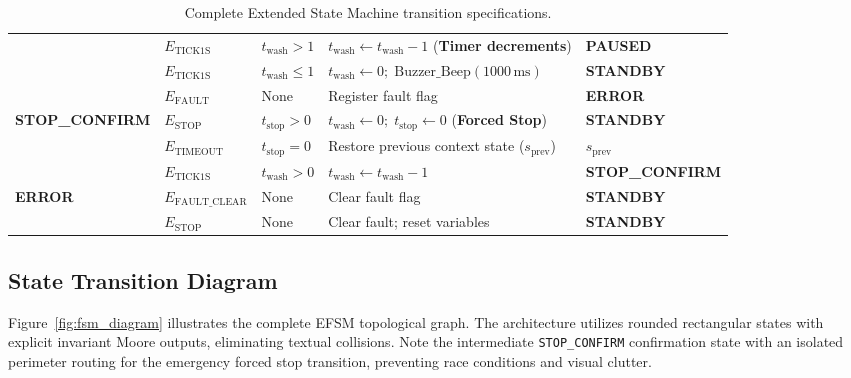\documentclass[12pt]{article}
\begin{document}
\begin{table}[H]
\begin{tabularx}{\textwidth}{l l l X l}
  & $E_{\text{TICK1S}}$ & $t_{\text{wash}} > 1$ & $t_{\text{wash}} \leftarrow t_{\text{wash}} - 1$ (\textbf{Timer decrements}) & \textbf{PAUSED} \\
  & $E_{\text{TICK1S}}$ & $t_{\text{wash}} \le 1$ & $t_{\text{wash}} \leftarrow 0;\; \text{Buzzer\_Beep}(1000\,\text{ms})$ & \textbf{STANDBY} \\
  & $E_{\text{FAULT}}$ & None & Register fault flag & \textbf{ERROR} \\
\midrule
\multirow{3}{*}{\textbf{STOP\_CONFIRM}} 
  & $E_{\text{STOP}}$ & $t_{\text{stop}} > 0$ & $t_{\text{wash}} \leftarrow 0;\; t_{\text{stop}} \leftarrow 0$ (\textbf{Forced Stop}) & \textbf{STANDBY} \\
  & $E_{\text{TIMEOUT}}$ & $t_{\text{stop}} = 0$ & Restore previous context state ($s_{\text{prev}}$) & $s_{\text{prev}}$ \\
  & $E_{\text{TICK1S}}$ & $t_{\text{wash}} > 0$ & $t_{\text{wash}} \leftarrow t_{\text{wash}} - 1$ & \textbf{STOP\_CONFIRM} \\
\midrule
\multirow{2}{*}{\textbf{ERROR}} 
  & $E_{\text{FAULT\_CLEAR}}$ & None & Clear fault flag & \textbf{STANDBY} \\
  & $E_{\text{STOP}}$ & None & Clear fault; reset variables & \textbf{STANDBY} \\
\bottomrule
\end{tabularx}
\caption{Complete Extended State Machine transition specifications.}
\label{tab:transition_table}
\end{table}

\subsection{State Transition Diagram}
Figure~\ref{fig:fsm_diagram} illustrates the complete EFSM topological graph. The architecture utilizes rounded rectangular states with explicit invariant Moore outputs, eliminating textual collisions. Note the intermediate \texttt{STOP\_CONFIRM} confirmation state with an isolated perimeter routing for the emergency forced stop transition, preventing race conditions and visual clutter.
\end{document}
